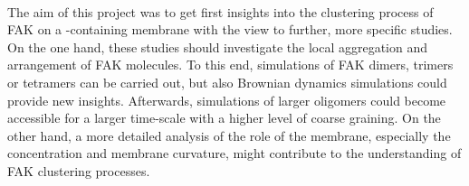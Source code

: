 \\
The aim of this project was to get first insights into the clustering process of FAK on a \pip{}-containing membrane with the view to further, more specific studies.\\
On the one hand, these studies should investigate the local aggregation and arrangement of FAK molecules. To this end, simulations of FAK dimers, trimers or tetramers can be carried out, but also Brownian dynamics simulations could provide new insights. Afterwards, simulations of larger oligomers could become accessible for a larger time-scale with a higher level of coarse graining. On the other hand, a more detailed analysis of the role of the membrane, especially the \pip{} concentration and membrane curvature, might contribute to the understanding of FAK clustering processes.

